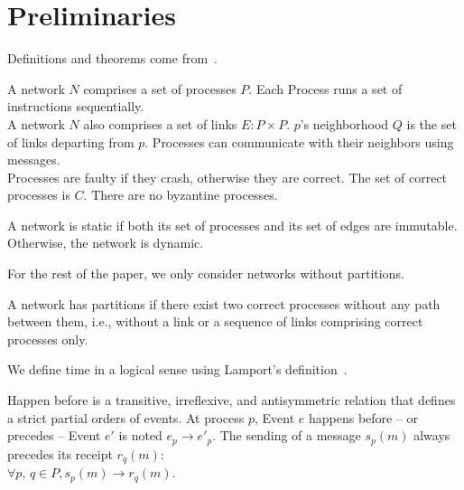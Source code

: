 
\section{Preliminaries}
\label{sec:preliminaries}

Definitions and theorems come from~\cite{hadzilacos1994modular}.

\begin{definition}[Network]
  A network $N$ comprises a set of processes $P$. Each Process runs a set of
  instructions sequentially. \\
  A network $N$ also comprises a set of links $E: P \times P$. $p$'s
  neighborhood $Q$ is the set of links departing from $p$. Processes can
  communicate with their 
  neighbors using messages. \\
  Processes are faulty if they crash, otherwise they are correct. The set of
  correct processes is $C$. There are no byzantine processes.
\end{definition}

\begin{definition}
  A network is static if both its set of processes and its set of edges are
  immutable. Otherwise, the network is dynamic.
\end{definition}

For the rest of the paper, we only consider networks without partitions.

\begin{definition}
  A network has partitions if there exist two correct processes without any path
  between them, i.e., without a link or a sequence of links comprising correct
  processes only.
\end{definition}


We define time in a logical sense using Lamport's
definition~\cite{lamport1978time}.

\begin{definition}
  Happen before is a transitive, irreflexive, and antisymmetric relation that
  defines a strict partial orders of events. At process $p$, Event $e$ happens
  before -- or precedes -- Event $e'$ is noted $e_p \rightarrow e'_p$. The
  sending of a message $s_p(m)$ always precedes its receipt $r_q(m)$: \\
  $\forall p,\,q \in P, s_p(m) \rightarrow r_q(m)$.
\end{definition}

